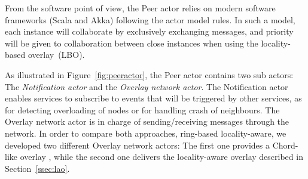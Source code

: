 From the software point of view, the Peer actor relies on modern software frameworks (Scala
and Akka) following the actor model rules. In such a model, each instance will
collaborate by exclusively exchanging messages, and priority will be given to collaboration
between close instances when using the locality-based overlay~(LBO).

%

As illustrated in Figure~\ref{fig:peeractor}, the Peer actor contains two sub actors: The
\emph{Notification actor} and the \emph{Overlay network actor}. The Notification actor
enables services to subscribe to events that will be triggered by other services, as for detecting
overloading of nodes or for handling crash of neighbours. The
Overlay network actor is in charge of sending/receiving messages through the network. In order
to compare both approaches, ring-based \vs locality-aware, we developed two different
Overlay network actors: The first one provides a Chord-like overlay
\cite{stoica2001chord}, while the second one delivers the locality-aware overlay described
in Section~\ref{ssec:lao}.

